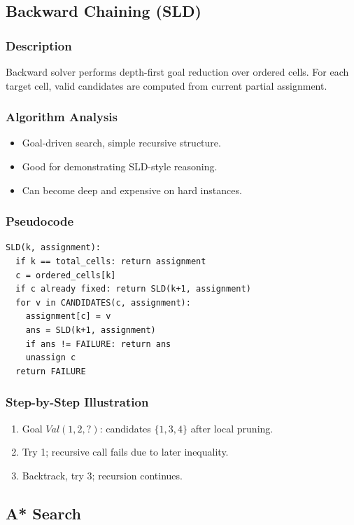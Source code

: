 \documentclass[12pt,a4paper]{article}
\begin{document}
\subsection{Backward Chaining (SLD)}
\subsubsection{Description}
Backward solver performs depth-first goal reduction over ordered cells.
For each target cell, valid candidates are computed from current partial assignment.

\subsubsection{Algorithm Analysis}
\begin{itemize}
    \item Goal-driven search, simple recursive structure.
    \item Good for demonstrating SLD-style reasoning.
    \item Can become deep and expensive on hard instances.
\end{itemize}

\subsubsection{Pseudocode}
\begin{lstlisting}[style=pseudostyle, caption={Backward Chaining (SLD-like)}]
SLD(k, assignment):
  if k == total_cells: return assignment
  c = ordered_cells[k]
  if c already fixed: return SLD(k+1, assignment)
  for v in CANDIDATES(c, assignment):
    assignment[c] = v
    ans = SLD(k+1, assignment)
    if ans != FAILURE: return ans
    unassign c
  return FAILURE
\end{lstlisting}

\subsubsection{Step-by-Step Illustration}
\begin{enumerate}
    \item Goal $Val(1,2,?)$: candidates $\{1,3,4\}$ after local pruning.
    \item Try 1; recursive call fails due to later inequality.
    \item Backtrack, try 3; recursion continues.
\end{enumerate}

\subsection{A* Search}
\end{document}
